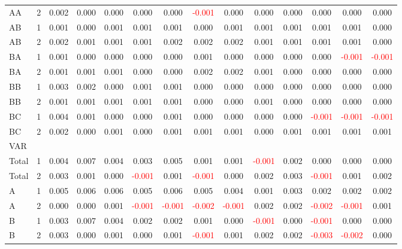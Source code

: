 \begin{table}[H]
{\begin{tabular}{llcccccccccccc}
AA & 2 & 0.002 & 0.000 & 0.000 & 0.000 & 0.000 & \textcolor{red}{-0.001} & 0.000 & 0.000 & 0.000 & 0.000 & 0.000 & 0.000\\
AB & 1 & 0.001 & 0.000 & 0.001 & 0.001 & 0.001 & 0.000 & 0.001 & 0.001 & 0.001 & 0.001 & 0.001 & 0.000\\
AB & 2 & 0.002 & 0.001 & 0.001 & 0.001 & 0.002 & 0.002 & 0.002 & 0.001 & 0.001 & 0.001 & 0.001 & 0.000\\
BA & 1 & 0.001 & 0.000 & 0.000 & 0.000 & 0.000 & 0.001 & 0.000 & 0.000 & 0.000 & 0.000 & \textcolor{red}{-0.001} & \textcolor{red}{-0.001}\\
BA & 2 & 0.001 & 0.001 & 0.001 & 0.000 & 0.000 & 0.002 & 0.002 & 0.001 & 0.000 & 0.000 & 0.000 & 0.000\\
BB & 1 & 0.003 & 0.002 & 0.000 & 0.001 & 0.001 & 0.000 & 0.000 & 0.000 & 0.000 & 0.000 & 0.000 & 0.000\\
BB & 2 & 0.001 & 0.001 & 0.001 & 0.001 & 0.001 & 0.000 & 0.000 & 0.001 & 0.000 & 0.000 & 0.000 & 0.000\\
BC & 1 & 0.004 & 0.001 & 0.000 & 0.000 & 0.001 & 0.000 & 0.000 & 0.000 & 0.000 & \textcolor{red}{-0.001} & \textcolor{red}{-0.001} & \textcolor{red}{-0.001}\\
BC & 2 & 0.002 & 0.000 & 0.001 & 0.000 & 0.001 & 0.001 & 0.001 & 0.000 & 0.001 & 0.001 & 0.001 & 0.001\\
\hline
VAR &  &  &  &  &  &  &  &  &  &  &  &  & \\
\hline
Total & 1 & 0.004 & 0.007 & 0.004 & 0.003 & 0.005 & 0.001 & 0.001 & \textcolor{red}{-0.001} & 0.002 & 0.000 & 0.000 & 0.000\\
Total & 2 & 0.003 & 0.001 & 0.000 & \textcolor{red}{-0.001} & 0.001 & \textcolor{red}{-0.001} & 0.000 & 0.002 & 0.003 & \textcolor{red}{-0.001} & 0.001 & 0.002\\
A & 1 & 0.005 & 0.006 & 0.006 & 0.005 & 0.006 & 0.005 & 0.004 & 0.001 & 0.003 & 0.002 & 0.002 & 0.002\\
A & 2 & 0.000 & 0.000 & 0.001 & \textcolor{red}{-0.001} & \textcolor{red}{-0.001} & \textcolor{red}{-0.002} & \textcolor{red}{-0.001} & 0.002 & 0.002 & \textcolor{red}{-0.002} & \textcolor{red}{-0.001} & 0.001\\
B & 1 & 0.003 & 0.007 & 0.004 & 0.002 & 0.002 & 0.001 & 0.000 & \textcolor{red}{-0.001} & 0.000 & \textcolor{red}{-0.001} & 0.000 & 0.000\\
B & 2 & 0.003 & 0.000 & 0.001 & 0.000 & 0.001 & \textcolor{red}{-0.001} & 0.001 & 0.002 & 0.002 & \textcolor{red}{-0.003} & \textcolor{red}{-0.002} & 0.000\\

\end{tabular}}
\end{table}
